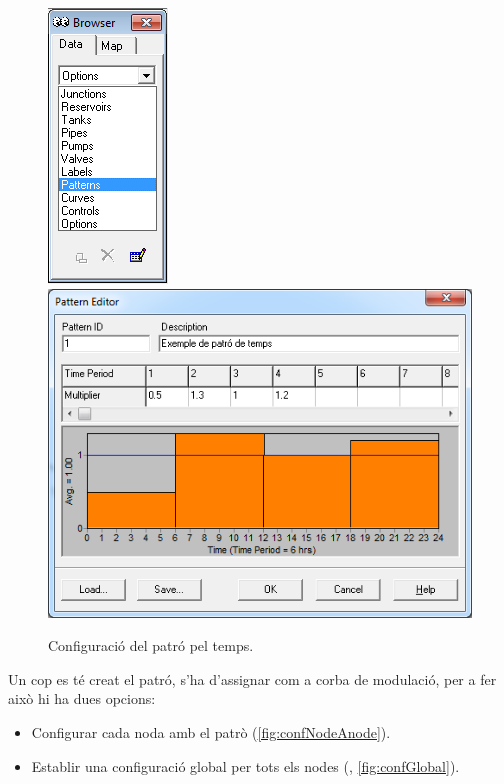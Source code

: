 \documentclass[12pt]{article}
\begin{document}
\begin{figure}
	\centering
	\includegraphics[scale=.5]{imatges/epanet/16.png}
	\includegraphics[scale=.7]{imatges/epanet/17.png}
	\caption{Configuració del patró pel temps.}
\end{figure}
Un cop es té creat el patró, s'ha d'assignar com a corba de modulació, per a fer això hi ha dues opcions:
\begin{itemize}
	\item Configurar cada noda amb el patrò (\ref{fig:confNodeAnode}).
	\item Establir una configuració global per tots els nodes (, \ref{fig:confGlobal}).
\end{itemize}
\end{document}
